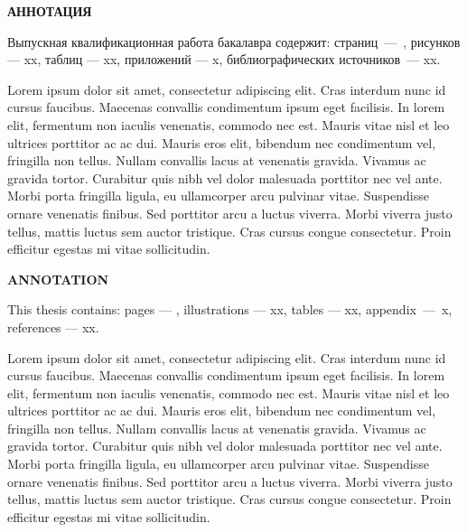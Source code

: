 \begin{center}
    \textbf{АННОТАЦИЯ}
\end{center}
     
Выпускная квалификационная работа бакалавра содержит: страниц~––~\pageref{LastPage}, рисунков  –– xx, таблиц –– xx, приложений –– x, библиографических источников~–– xx.

Lorem ipsum dolor sit amet, consectetur adipiscing elit. Cras interdum nunc id cursus faucibus. Maecenas convallis condimentum ipsum eget facilisis. In lorem elit, fermentum non iaculis venenatis, commodo nec est. Mauris vitae nisl et leo ultrices porttitor ac ac dui. Mauris eros elit, bibendum nec condimentum vel, fringilla non tellus. Nullam convallis lacus at venenatis gravida. Vivamus ac gravida tortor. Curabitur quis nibh vel dolor malesuada porttitor nec vel ante. Morbi porta fringilla ligula, eu ullamcorper arcu pulvinar vitae. Suspendisse ornare venenatis finibus. Sed porttitor arcu a luctus viverra. Morbi viverra justo tellus, mattis luctus sem auctor tristique. Cras cursus congue consectetur. Proin efficitur egestas mi vitae sollicitudin.

\begin{center}
    \textbf{ANNOTATION}
\end{center}

This thesis contains: pages –– \pageref{LastPage}, illustrations –– xx, tables –– xx, appendix~––~x, references –– xx.

Lorem ipsum dolor sit amet, consectetur adipiscing elit. Cras interdum nunc id cursus faucibus. Maecenas convallis condimentum ipsum eget facilisis. In lorem elit, fermentum non iaculis venenatis, commodo nec est. Mauris vitae nisl et leo ultrices porttitor ac ac dui. Mauris eros elit, bibendum nec condimentum vel, fringilla non tellus. Nullam convallis lacus at venenatis gravida. Vivamus ac gravida tortor. Curabitur quis nibh vel dolor malesuada porttitor nec vel ante. Morbi porta fringilla ligula, eu ullamcorper arcu pulvinar vitae. Suspendisse ornare venenatis finibus. Sed porttitor arcu a luctus viverra. Morbi viverra justo tellus, mattis luctus sem auctor tristique. Cras cursus congue consectetur. Proin efficitur egestas mi vitae sollicitudin.

\newpage